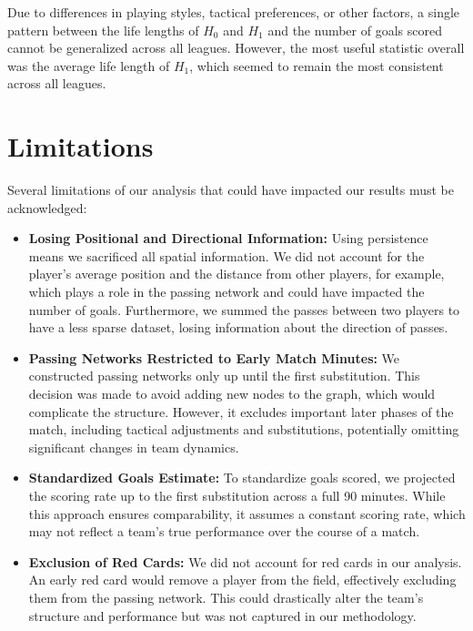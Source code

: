 \documentclass[10pt,twocolumn]{article}
\begin{document}
Due to differences in playing styles, tactical preferences, or other factors, a single pattern between the life lengths of $ H_0 $ and $ H_1 $ and the number of goals scored cannot be generalized across all leagues. However, the most useful statistic overall was the average life length of $ H_1 $, which seemed to remain the most consistent across all leagues.

\section*{Limitations}

Several limitations of our analysis that could have impacted our results must be acknowledged:

\begin{itemize}
    \item \textbf{Losing Positional and Directional Information:} Using persistence means we sacrificed all spatial information. We did not account for the player's average position and the distance from other players, for example, which plays a role in the passing network and could have impacted the number of goals. Furthermore, we summed the passes between two players to have a less sparse dataset, losing information about the direction of passes.
    
    \item \textbf{Passing Networks Restricted to Early Match Minutes:} We constructed passing networks only up until the first substitution. This decision was made to avoid adding new nodes to the graph, which would complicate the structure. However, it excludes important later phases of the match, including tactical adjustments and substitutions, potentially omitting significant changes in team dynamics.
    
    \item \textbf{Standardized Goals Estimate:} To standardize goals scored, we projected the scoring rate up to the first substitution across a full 90 minutes. While this approach ensures comparability, it assumes a constant scoring rate, which may not reflect a team's true performance over the course of a match.
    
    \item \textbf{Exclusion of Red Cards:} We did not account for red cards in our analysis. An early red card would remove a player from the field, effectively excluding them from the passing network. This could drastically alter the team’s structure and performance but was not captured in our methodology.
    

\end{itemize}
\end{document}
